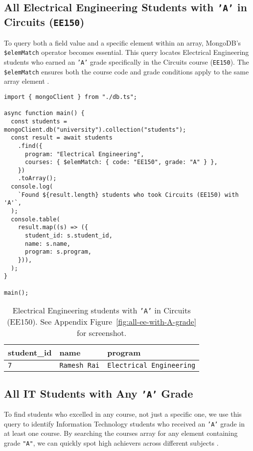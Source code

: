 \subsection{All Electrical Engineering Students with \texttt{'A'} in Circuits (\texttt{EE150})}
To query both a field value and a specific element within an array, MongoDB's \texttt{\$elemMatch} operator becomes essential. This query locates Electrical Engineering students who earned an \texttt{'A'} grade specifically in the Circuits course (\texttt{EE150}). The \texttt{\$elemMatch} ensures both the course code and grade conditions apply to the same array element \parencite{mongodb_architecture}.

\begin{verbatim}
import { mongoClient } from "./db.ts";

async function main() {
  const students = mongoClient.db("university").collection("students");
  const result = await students
    .find({
      program: "Electrical Engineering",
      courses: { $elemMatch: { code: "EE150", grade: "A" } },
    })
    .toArray();
  console.log(
    `Found ${result.length} students who took Circuits (EE150) with 'A'`,
  );
  console.table(
    result.map((s) => ({
      student_id: s.student_id,
      name: s.name,
      program: s.program,
    })),
  );
}

main();
\end{verbatim}

\begin{table}[H]
  \centering
  \begin{tabular}{|l|l|l|}
    \hline
    \textbf{student\_id} & \textbf{name} & \textbf{program} \\
    \hline
    \texttt{7} & \texttt{Ramesh Rai} & \texttt{Electrical Engineering} \\
    \hline
  \end{tabular}
      \caption{Electrical Engineering students with \texttt{'A'} in Circuits (EE150). See Appendix Figure~\ref{fig:all-ee-with-A-grade} for screenshot.}
\end{table}

\subsection{All IT Students with Any \texttt{'A'} Grade}
To find students who excelled in any course, not just a specific one, we use this query to identify Information Technology students who received an \texttt{'A'} grade in at least one course. By searching the courses array for any element containing grade \texttt{"A"}, we can quickly spot high achievers across different subjects \parencite{mongodb_definitive_guide}.

